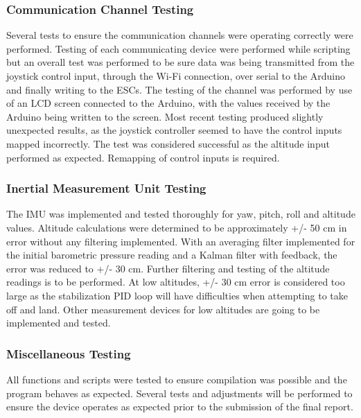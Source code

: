  \subsubsection{Communication Channel Testing}
 
 Several tests to ensure the communication channels were operating correctly were performed. Testing of each communicating device were performed while scripting but an overall test was performed to be sure data was being transmitted from the joystick control input, through the Wi-Fi connection, over serial to the Arduino and finally writing to the ESCs. The testing of the channel was performed by use of an LCD screen connected to the Arduino, with the values received by the Arduino being written to the screen. Most recent testing produced slightly unexpected results, as the joystick controller seemed to have the control inputs mapped incorrectly. The test was considered successful as the altitude input performed as expected. Remapping of control inputs is required. 

\subsubsection{Inertial Measurement Unit Testing}

The IMU was implemented and tested thoroughly for yaw, pitch, roll and altitude values. Altitude calculations were determined to be approximately +/- 50 cm in error without any filtering implemented. With an averaging filter implemented for the initial barometric pressure reading and a Kalman filter with feedback, the error was reduced to +/- 30 cm. Further filtering and testing of the altitude readings is to be performed. At low altitudes, +/- 30 cm error is considered too large as the stabilization PID loop will have difficulties when attempting to take off and land. Other measurement devices for low altitudes are going to be implemented and tested.

\subsubsection{Miscellaneous Testing}

All functions and scripts were tested to ensure compilation was possible and the program behaves as expected. Several tests and adjustments will be performed to ensure the device operates as expected prior to the submission of the final report. 




